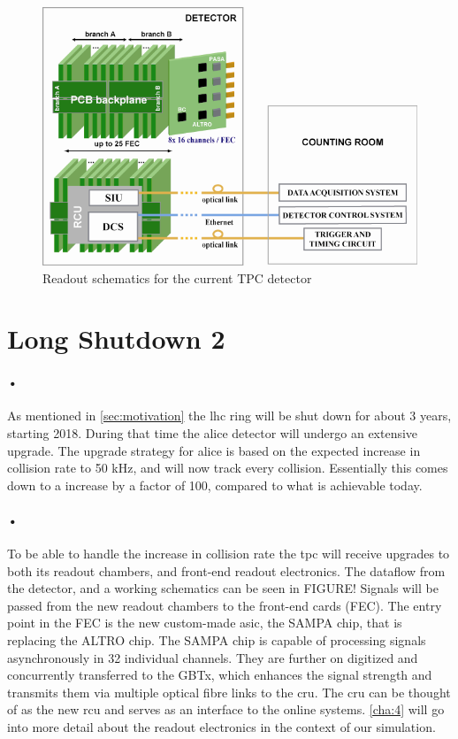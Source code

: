 \documentclass[a4paper]{report}
\begin{document}
\begin{figure}[h!]
  \centering
    \includegraphics[width=1.0\textwidth]{images/altro.png}
     \caption{Readout schematics for the current TPC detector}
    \label{fig:altro}
\end{figure}

\section{Long Shutdown 2}
\paragraph{•}
As mentioned in \ref{sec:motivation} the \gls{lhc} ring will be shut down for about 3 years, starting 2018.
During that time the \gls{alice} detector will undergo an extensive upgrade.
The upgrade strategy for \gls{alice} is based on the expected increase in collision rate to 50 kHz, and will now track every collision.
Essentially this comes down to a increase by a factor of 100, compared to what is achievable today.

\paragraph{•} %
To be able to handle the increase in collision rate the \gls{tpc} will receive upgrades to both its readout chambers, and front-end readout electronics.
The dataflow from the detector, and a working schematics can be seen in FIGURE!
Signals will be passed from the new readout chambers to the front-end cards (FEC). 
The entry point in the FEC is the new custom-made \gls{asic}, the SAMPA chip, that is replacing the ALTRO chip.\cite{tdr-015}
The SAMPA chip is capable of processing signals asynchronously in 32 individual channels.
They are further on digitized and concurrently transferred to the GBTx, which enhances the signal strength and transmits them via multiple optical fibre links to the \gls{cru}.
The \gls{cru} can be thought of as the new \gls{rcu} and serves as an interface to the online systems.
\ref{cha:4} will go into more detail about the readout electronics in the context of our simulation.
\end{document}
